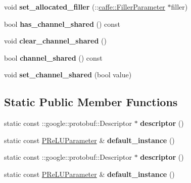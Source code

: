 \begin{DoxyCompactItemize}
void {\bfseries set\+\_\+allocated\+\_\+filler} (\+::\mbox{\hyperlink{classcaffe_1_1_filler_parameter}{caffe\+::\+Filler\+Parameter}} $\ast$filler)
\item 
\mbox{\label{classcaffe_1_1_p_re_l_u_parameter_aada7d34f2225819c6fe107ff5b7fa671}} 
bool {\bfseries has\+\_\+channel\+\_\+shared} () const
\item 
\mbox{\label{classcaffe_1_1_p_re_l_u_parameter_aa567336b14b85320f2d652123cba9f56}} 
void {\bfseries clear\+\_\+channel\+\_\+shared} ()
\item 
\mbox{\label{classcaffe_1_1_p_re_l_u_parameter_a56a708a37000cbb87536ca9a0be7e375}} 
bool {\bfseries channel\+\_\+shared} () const
\item 
\mbox{\label{classcaffe_1_1_p_re_l_u_parameter_af0482ada818ef9ec460073fa86936fb8}} 
void {\bfseries set\+\_\+channel\+\_\+shared} (bool value)
\end{DoxyCompactItemize}
\subsection*{Static Public Member Functions}
\begin{DoxyCompactItemize}
\item 
\mbox{\label{classcaffe_1_1_p_re_l_u_parameter_a2d6dc0a88ba59abfb03c647777f7e6db}} 
static const \+::google\+::protobuf\+::\+Descriptor $\ast$ {\bfseries descriptor} ()
\item 
\mbox{\label{classcaffe_1_1_p_re_l_u_parameter_a3bae558affaf776d7cd608def29b09a3}} 
static const \mbox{\hyperlink{classcaffe_1_1_p_re_l_u_parameter}{P\+Re\+L\+U\+Parameter}} \& {\bfseries default\+\_\+instance} ()
\item 
\mbox{\label{classcaffe_1_1_p_re_l_u_parameter_ab3b58497e41997509aaa8162b5bbacd3}} 
static const \+::google\+::protobuf\+::\+Descriptor $\ast$ {\bfseries descriptor} ()
\item 
\mbox{\label{classcaffe_1_1_p_re_l_u_parameter_a11c9b56573e2689ff1b3e3cc0cf691b7}} 
static const \mbox{\hyperlink{classcaffe_1_1_p_re_l_u_parameter}{P\+Re\+L\+U\+Parameter}} \& {\bfseries default\+\_\+instance} ()
\end{DoxyCompactItemize}
